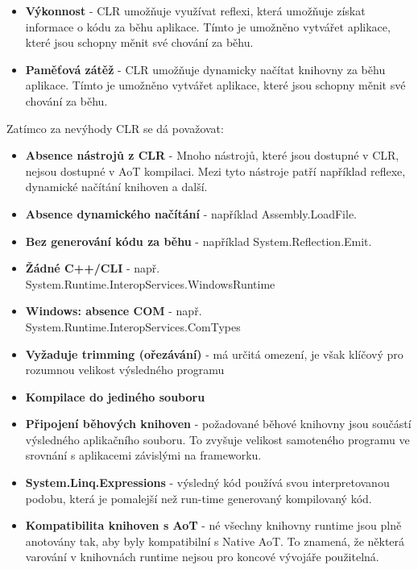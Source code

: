 \begin{itemize}
    \item  \textbf{Výkonnost} - CLR umožňuje využívat reflexi, která umožňuje získat informace o kódu za běhu aplikace. Tímto je umožněno vytvářet aplikace, které jsou schopny měnit své chování za běhu.
    \item \textbf{Paměťová zátěž} - CLR umožňuje dynamicky načítat knihovny za běhu aplikace. Tímto je umožněno vytvářet aplikace, které jsou schopny měnit své chování za běhu.
\end{itemize}


Zatímco za nevýhody CLR se dá považovat:

\begin{itemize}
    \item  \textbf{Absence nástrojů z CLR} - Mnoho nástrojů, které jsou dostupné v CLR, nejsou dostupné v AoT kompilaci. Mezi tyto nástroje patří například reflexe, dynamické načítání knihoven a další.
    \item \textbf{Absence dynamického načítání} - například Assembly.LoadFile.
    \item \textbf{Bez generování kódu za běhu} - například System.Reflection.Emit.
    \item \textbf{Žádné C++/CLI} - např. System.Runtime.InteropServices.WindowsRuntime
    \item \textbf{Windows: absence COM} - např. System.Runtime.InteropServices.ComTypes
    \item \textbf{Vyžaduje trimming (ořezávání)} - má určitá omezení, je však klíčový pro rozumnou velikost výsledného programu
    \item \textbf{Kompilace do jediného souboru} 
    \item \textbf{Připojení běhových knihoven} - požadované běhové knihovny jsou součástí výsledného aplikačního souboru. To zvyšuje velikost samoteného programu ve srovnání s aplikacemi závislými na frameworku.
    \item \textbf{System.Linq.Expressions} - výsledný kód používá svou interpretovanou podobu, která je pomalejší než run-time generovaný kompilovaný kód.
    \item \textbf{Kompatibilita knihoven s AoT} - né všechny knihovny runtime jsou plně anotovány tak, aby byly kompatibilní s Native AoT. To znamená, že některá varování v knihovnách runtime nejsou pro koncové vývojáře použitelná.
\end{itemize}


